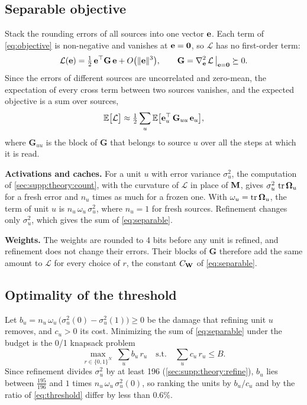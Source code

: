 \subsection{Separable objective}
\label{sec:supp:theory:separable}
Stack the rounding errors of all sources into one vector $\mathbf{e}$.
Each term of \cref{eq:objective} is non-negative and vanishes at $\mathbf{e} = \mathbf{0}$, so $\mathcal{L}$ has no first-order term:
\begin{equation}
  \mathcal{L}(\mathbf{e}) = \tfrac12\, \mathbf{e}^\top \mathbf{G}\, \mathbf{e} + O\big(\|\mathbf{e}\|^3\big), \qquad \mathbf{G} = \nabla^2_{\mathbf{e}}\, \mathcal{L}\,\big|_{\mathbf{e} = \mathbf{0}} \succeq 0 .
\end{equation}
Since the errors of different sources are uncorrelated and zero-mean, the expectation of every cross term between two sources vanishes, and the expected objective is a sum over sources,
\begin{equation}
  \mathbb{E}\big[\mathcal{L}\big] \approx \tfrac12 \sum_u \mathbb{E}\big[\mathbf{e}_u^\top\, \mathbf{G}_{uu}\, \mathbf{e}_u\big],
  \label{eq:supp:sum}
\end{equation}
where $\mathbf{G}_{uu}$ is the block of $\mathbf{G}$ that belongs to source $u$ over all the steps at which it is read.

\noindent\textbf{Activations and caches.}
For a unit $u$ with error variance $\sigma_u^2$, the computation of \cref{sec:supp:theory:count}, with the curvature of $\mathcal{L}$ in place of $\mathbf{M}$, gives $\sigma_u^2\, \operatorname{tr}\boldsymbol{\Omega}_u$ for a fresh error and $n_u$ times as much for a frozen one.
With $\omega_u = \operatorname{tr}\boldsymbol{\Omega}_u$, the term of unit $u$ is $n_u\, \omega_u\, \sigma_u^2$, where $n_u = 1$ for fresh sources.
Refinement changes only $\sigma_u^2$, which gives the sum of \cref{eq:separable}.

\noindent\textbf{Weights.}
The weights are rounded to 4 bits before any unit is refined, and refinement does not change their errors.
Their blocks of $\mathbf{G}$ therefore add the same amount to $\mathcal{L}$ for every choice of $r$, the constant $C_{\mathbf{W}}$ of \cref{eq:separable}.

\subsection{Optimality of the threshold}
\label{sec:supp:theory:threshold}
Let $b_u = n_u\, \omega_u\, \big(\sigma_u^2(0) - \sigma_u^2(1)\big) \ge 0$ be the damage that refining unit $u$ removes, and $c_u > 0$ its cost.
Minimizing the sum of \cref{eq:separable} under the budget is the 0/1 knapsack problem
\begin{equation}
  \max_{r \in \{0,1\}^N}\; \sum_u b_u\, r_u \quad \text{s.t.} \quad \sum_u c_u\, r_u \le B .
  \label{eq:supp:knapsack}
\end{equation}
Since refinement divides $\sigma_u^2$ by at least 196 (\cref{sec:supp:theory:refine}), $b_u$ lies between $\tfrac{195}{196}$ and $1$ times $n_u\, \omega_u\, \sigma_u^2(0)$, so ranking the units by $b_u / c_u$ and by the ratio of \cref{eq:threshold} differ by less than 0.6\%.

